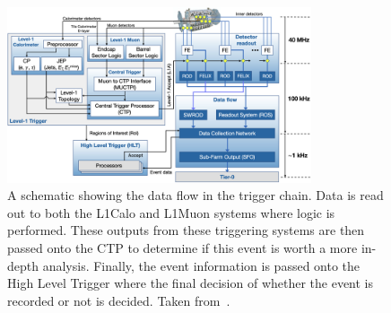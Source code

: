 \begin{figure}
    \centering
    \includegraphics[width=0.8\textwidth]{figures/atlas/atlas_trigger_system.png}
\caption{A schematic showing the data flow in the trigger chain. Data is read out to both the L1Calo and L1Muon systems where logic is performed. These outputs from these triggering systems are then passed onto the CTP to determine if this event is worth a more in-depth analysis. Finally, the event information is passed onto the High Level Trigger where the final decision of whether the event is recorded or not is decided. Taken from~\cite{atlas_trigger_system}.}\label{fig:atlas_trigger_chain}
\end{figure}
